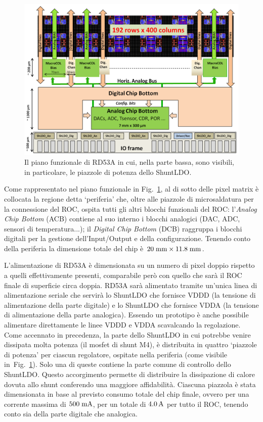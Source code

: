 \begin{figure}
\centering
\includegraphics[scale=.4]{Immagini/RD53Apianofunzionale}
\caption{Il piano funzionale di RD53A in cui, nella parte bassa, sono visibili, in particolare, le piazzole di potenza dello ShuntLDO.}
\label{RD53AFunct}
\end{figure}
Come rappresentato nel piano funzionale in Fig.~\ref{RD53AFunct}, al di sotto delle pixel matrix \`e collocata la regione detta `periferia' che, oltre alle piazzole di microsaldatura per la connessione del ROC, ospita tutti gli altri blocchi funzionali del ROC: l'{\em Analog Chip Bottom} (ACB) contiene al suo interno i blocchi analogici (DAC, ADC, sensori di temperatura...); il {\em Digital Chip Bottom} (DCB) raggruppa i blocchi digitali per la gestione dell'Input/Output e della configurazione. Tenendo conto della periferia la dimensione totale del chip \`e $20\rm \; mm \times 11.8\rm \; mm$.

L'alimentazione di RD53A \`e dimensionata su un numero di pixel doppio rispetto a quelli effettivamente presenti, comparabile per\`o con quello che sar\`a il ROC finale di superficie circa doppia. RD53A sar\`a alimentato tramite un'unica linea di alimentazione seriale che servirà lo ShuntLDO che fornisce VDDD (la tensione di alimentazione della parte digitale) e lo ShuntLDO che fornisce VDDA (la tensione di alimentazione della parte analogica). Essendo un prototipo \`e anche possibile alimentare direttamente le linee VDDD e VDDA scavalcando la regolazione. %
Come accennato in precedenza, la parte dello ShuntLDO in cui potrebbe venire dissipata molta potenza (il mosfet di shunt M4), \`e distribuita in quattro `piazzole di potenza' per ciascun regolatore, ospitate nella periferia (come visibile in~Fig.~\ref{RD53AFunct}). Solo una di queste contiene la parte comune di controllo dello ShuntLDO. Questo accorgimento permette di distribuire la dissipazione di calore dovuta allo shunt conferendo una maggiore affidabilit\`a. Ciascuna piazzola \`e stata dimensionata in base al previsto consumo totale del chip finale, ovvero per una corrente massima di $500\rm \; mA$, per un totale di $4.0\rm \, A$ per tutto il ROC, tenendo conto sia della parte digitale che analogica.

